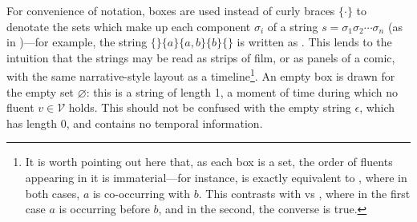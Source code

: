 \documentclass[a4paper,12pt,leqno,twoside]{article}
\newcommand{\vph}[1]{\vphantom{#1}}
\newcommand{\ebox}[1]{\fbox{$\vph{'(),}#1$}}
\newcommand{\V}{\mathcal{V}}
\renewcommand{\emptyset}{\varnothing}
\newcommand{\EventString}[1]{%
	\renewcommand*{\do}[1]{\ebox{##1}}%
	\PipeParser{#1}%
}
\begin{document}
For convenience of notation, boxes \ebox{\cdot} are used instead of curly braces $\{\cdot\}$ to denotate the sets which make up each component $\sigma_i$ of a string $s = \sigma_1\sigma_2\cdots\sigma_n$ (as in \citet{Fernando2004,fernando2015semantics,fernando2016prior,woods2017towards})---for example, the string $\{\}\{a\}\{a,b\}\{b\}\{\}$ is written as \EventString{{}|a|a,b|b|{}}. This lends to the intuition that the strings may be read as strips of film, or as panels of a comic, with the same narrative-style layout as a timeline\footnote{It is worth pointing out here that, as each box is a set, the order of fluents appearing in it is immaterial---for instance, \EventString{a,b} is exactly equivalent to \EventString{b,a}, where in both cases, $a$ is co-occurring with $b$. This contrasts with \EventString{a|b} vs \EventString{b|a}, where in the first case $a$ is occurring before $b$, and in the second, the converse is true.}. An empty box \ebox{} is drawn for the empty set $\emptyset$: this is a string of length 1, a moment of time during which no fluent $v \in \V$ holds. This should not be confused with the empty string $\epsilon$, which has length 0, and contains no temporal information.
\end{document}
